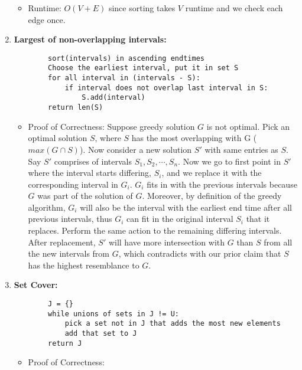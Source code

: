 \begin{enumerate}
        \begin{itemize}
            \item Runtime: $O(V+E)$ since sorting takes $V$ runtime and we check each edge once.
        \end{itemize}

        \item \textbf{Largest of non-overlapping intervals: }
        \begin{verbatim}
        sort(intervals) in ascending endtimes
        Choose the earliest interval, put it in set S
        for all interval in (intervals - S):
            if interval does not overlap last interval in S:
                S.add(interval)
        return len(S)
        \end{verbatim}
        \begin{itemize}
            \item Proof of Correctness: Suppose greedy solution $G$ is not optimal. Pick an optimal solution $S$, where $S$ has the most overlapping with G ($max(G\cap S)$). Now consider a new solution $S'$ with same entries as $S$. Say $S'$ comprises of intervals $S_1, S_2, \cdots, S_n$. Now we go to first point in $S'$ where the interval starts differing, $S_i$, and we replace it with the corresponding interval in $G_i$. $G_i$ fits in with the previous intervals because $G$ was part of the solution of $G$. Moreover, by definition of the greedy algorithm, $G_i$ will also be the interval with the earliest end time after all previous intervals, thus $G_i$ can fit in the original interval $S_i$ that it replaces. Perform the same action to the remaining differing intervals. After replacement, $S'$ will have more intersection with $G$ than $S$ from all the new intervals from $G$, which contradicts with our prior claim that $S$ has the highest resemblance to $G$.
        \end{itemize}

        \item \textbf{Set Cover: }
        \begin{verbatim}
        J = {}
        while unions of sets in J != U:
            pick a set not in J that adds the most new elements
            add that set to J
        return J
        \end{verbatim}
        \begin{itemize}
            \item Proof of Correctness: 
        \end{itemize}
    \end{enumerate}


